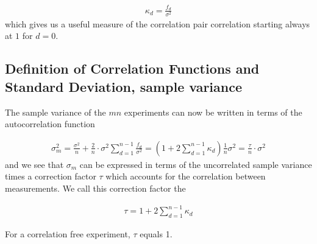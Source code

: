 \documentclass[letterpaper,10pt,english]{sphinxmanual}
\begin{document}
\begin{equation*}
\begin{split}
\begin{equation}
\kappa_d = \frac{f_d}{\sigma^2}
\label{eq:autocorrelformal} \tag{9}
\end{equation}
\end{split}
\end{equation*}
which gives us a useful measure of the correlation pair correlation
starting always at \(1\) for \(d=0\).


\subsection{Definition of Correlation Functions and Standard Deviation, sample variance}
\label{\detokenize{chapter2:definition-of-correlation-functions-and-standard-deviation-sample-variance}}
The sample variance of the \(mn\) experiments can now be
written in terms of the autocorrelation function




\begin{equation*}
\begin{split}
\begin{equation}
\sigma_m^2=\frac{\sigma^2}{n}+\frac{2}{n}\cdot\sigma^2\sum_{d=1}^{n-1}
\frac{f_d}{\sigma^2}=\left(1+2\sum_{d=1}^{n-1}\kappa_d\right)\frac{1}{n}\sigma^2=\frac{\tau}{n}\cdot\sigma^2
\label{eq:error_estimate_corr_time} \tag{10}
\end{equation}
\end{split}
\end{equation*}
and we see that \(\sigma_m\) can be expressed in terms of the
uncorrelated sample variance times a correction factor \(\tau\) which
accounts for the correlation between measurements. We call this
correction factor the 




\begin{equation*}
\begin{split}
\begin{equation}
\tau = 1+2\sum_{d=1}^{n-1}\kappa_d
\label{eq:autocorrelation_time} \tag{11}
\end{equation}
\end{split}
\end{equation*}




For a correlation free experiment, \(\tau\)
equals 1.
\end{document}
